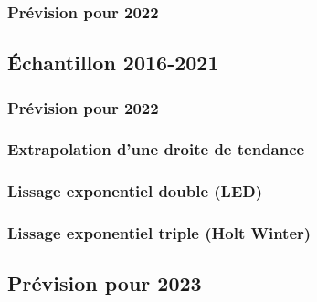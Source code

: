 \subsubsection{Prévision pour 2022}

\subsection{Échantillon 2016-2021}
\subsubsection{Prévision pour 2022}
\subsubsection*{Extrapolation d'une droite de tendance}
\subsubsection*{Lissage exponentiel double (LED)}
\subsubsection*{Lissage exponentiel triple (Holt Winter)}
\subsection{Prévision pour 2023}